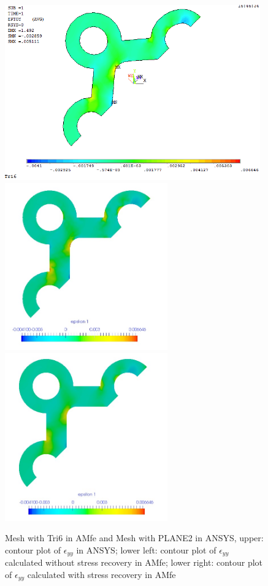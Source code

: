 \begin{figure}[htbp]
	\begin{center}
		\includegraphics[width=11cm,clip]{Tri6_Eyy.png} 
		\includegraphics[width=7cm,clip]{Tri6_Eyy_PD.png} 		
		\includegraphics[width=7cm,clip]{Tri6_Eyy_P.png} 		
		\caption{Mesh with Tri6 in AMfe and Mesh with PLANE2 in ANSYS, upper: contour plot of $\epsilon_{yy}$ in ANSYS; lower left: contour plot of $\epsilon_{yy}$ calculated without stress recovery in AMfe; lower right: contour plot of $\epsilon_{yy}$ calculated with stress recovery in AMfe} \label{fig: Tri6_Eyy}
	\end{center}
\end{figure}
\clearpage 


